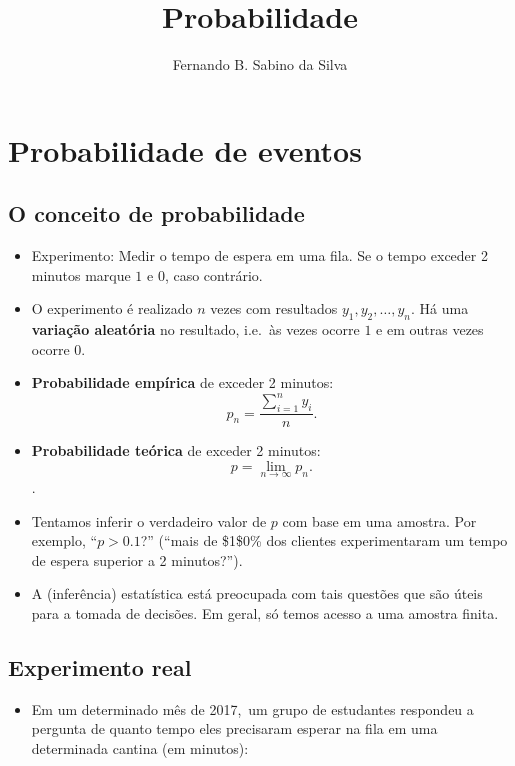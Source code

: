 \documentclass[]{article}
\title{Probabilidade}
\author{Fernando B. Sabino da Silva}
\date{}
\providecommand{\tightlist}{%
  \setlength{\itemsep}{0pt}\setlength{\parskip}{0pt}}
\begin{document}
\maketitle

{
\setcounter{tocdepth}{2}
\tableofcontents
}
\section{Probabilidade de eventos}\label{probabilidade-de-eventos}

\subsection{O conceito de
probabilidade}\label{o-conceito-de-probabilidade}

\begin{itemize}
\tightlist
\item
  Experimento: Medir o tempo de espera em uma fila. Se o tempo exceder 2
  minutos marque \(1\) e 0, caso contrário.
\item
  O experimento é realizado \(n\) vezes com resultados
  \(y_1,y_2,\ldots,y_n\). Há uma \textbf{variação aleatória} no
  resultado, i.e.~às vezes ocorre \(1\) e em outras vezes ocorre 0.
\item
  \textbf{Probabilidade empírica} de exceder 2 minutos:\\
  \[ 
  p_n = \frac{\sum_{i=1}^n y_i}{n}.
  \]
\item
  \textbf{Probabilidade teórica} de exceder 2 minutos:~ \[
  p = \lim_{n\rightarrow\infty} p_n.
  \].
\item
  Tentamos inferir o verdadeiro valor de \(p\) com base em uma amostra.
  Por exemplo, ``\(p > 0.1\)?'' (``mais de \$1\$0\% dos clientes
  experimentaram um tempo de espera superior a 2 minutos?'').
\item
  A (inferência) estatística está preocupada com tais questões que são
  úteis para a tomada de decisões. Em geral, só temos acesso a uma
  amostra finita.
\end{itemize}

\subsection{Experimento real}\label{experimento-real}

\begin{itemize}
\tightlist
\item
  Em um determinado mês de 2017,~um grupo de estudantes respondeu a
  pergunta de quanto tempo eles precisaram esperar na fila em uma
  determinada cantina (em minutos):
\end{itemize}
\end{document}
